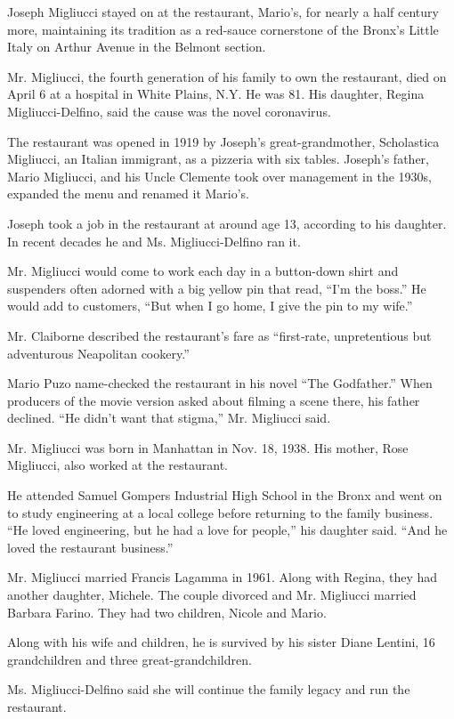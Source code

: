 Joseph Migliucci stayed on at the restaurant, Mario's, for nearly a half
century more, maintaining its tradition as a red-sauce cornerstone of
the Bronx's Little Italy on Arthur Avenue in the Belmont section.

Mr. Migliucci, the fourth generation of his family to own the
restaurant, died on April 6 at a hospital in White Plains, N.Y. He was
81. His daughter, Regina Migliucci-Delfino, said the cause was the novel
coronavirus.

The restaurant was opened in 1919 by Joseph's great-grandmother,
Scholastica Migliucci, an Italian immigrant, as a pizzeria with six
tables. Joseph's father, Mario Migliucci, and his Uncle Clemente took
over management in the 1930s, expanded the menu and renamed it Mario's.

Joseph took a job in the restaurant at around age 13, according to his
daughter. In recent decades he and Ms. Migliucci-Delfino ran it.

Mr. Migliucci would come to work each day in a button-down shirt and
suspenders often adorned with a big yellow pin that read, ``I'm the
boss.'' He would add to customers, ``But when I go home, I give the pin
to my wife.''

Mr. Claiborne described the restaurant's fare as ``first‐rate,
unpretentious but adventurous Neapolitan cookery.''

Mario Puzo name-checked the restaurant in his novel ``The Godfather.''
When producers of the movie version asked about filming a scene there,
his father declined. ``He didn't want that stigma,'' Mr. Migliucci said.

Mr. Migliucci was born in Manhattan in Nov. 18, 1938. His mother, Rose
Migliucci, also worked at the restaurant.

He attended Samuel Gompers Industrial High School in the Bronx and went
on to study engineering at a local college before returning to the
family business. ``He loved engineering, but he had a love for people,''
his daughter said. ``And he loved the restaurant business.''

Mr. Migliucci married Francis Lagamma in 1961. Along with Regina, they
had another daughter, Michele. The couple divorced and Mr. Migliucci
married Barbara Farino. They had two children, Nicole and Mario.

Along with his wife and children, he is survived by his sister Diane
Lentini, 16 grandchildren and three great-grandchildren.

Ms. Migliucci-Delfino said she will continue the family legacy and run
the restaurant.

